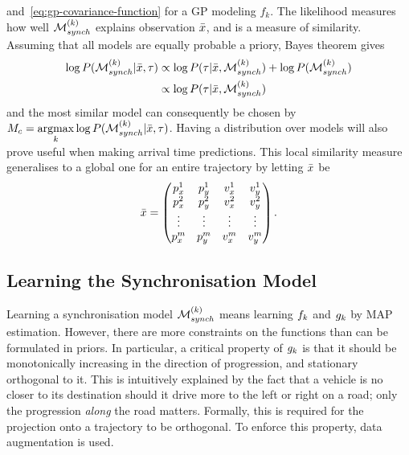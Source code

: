 and~\ref{eq:gp-covariance-function} for a GP modeling $f_{k}$. The
likelihood measures how well $\mathcal{M}_{synch}^{(k)}$ explains observation
$\bar{x}$, and is a measure of similarity. Assuming that all models
are equally probable a priory, Bayes theorem gives
\begin{equation}
  \label{eq:model-posterior}
  \begin{split}
    \log P(\mathcal{M}_{synch}^{(k)} | \bar{x}, \tau)
    & \propto \log P(\tau|\bar{x}, \mathcal{M}_{synch}^{(k)}) + \log
    P(\mathcal{M}_{synch}^{(k)}) \\
    & \propto \log P(\tau|\bar{x}, \mathcal{M}_{synch}^{(k)})
  \end{split}
\end{equation}
and the most similar model can consequently be chosen by $M_{c} = \underset{k}{\mathrm{argmax}} \log
P(\mathcal{M}_{synch}^{(k)} | \bar{x}, \tau)$. Having a distribution
over models will also prove useful when making arrival time
predictions. This local similarity measure generalises to a global one
for an entire trajectory by letting $\bar{x}$ be
\[\bar{x} =
  \begin{pmatrix}
    p_{x}^{1} & p_{y}^{1} & v_{x}^{1} & v_{y}^{1} \\
    p_{x}^{2} & p_{y}^{2} & v_{x}^{2} & v_{y}^{2} \\
    \vdots  & \vdots  & \vdots & \vdots  \\
    p_{x}^{m} & p_{y}^{m} & v_{x}^{m} & v_{y}^{m} \\
  \end{pmatrix}.
\]

\subsection{Learning the Synchronisation Model}
Learning a synchronisation model $\mathcal{M}_{synch}^{(k)}$ means learning
$f_{k}$ and $g_{k}$ by MAP estimation. However, there are
more constraints on the functions than can be formulated in
priors. In particular, a critical property of $g_{k}$
is that it should be monotonically increasing in the direction of progression,
and stationary orthogonal to it. This is intuitively explained by the fact that a
vehicle is no closer to its destination should it drive more to the
left or right on a road; only the progression \textit{along} the road
matters. Formally, this is required for the projection onto a
trajectory to be orthogonal. To enforce this property, data augmentation is used.

